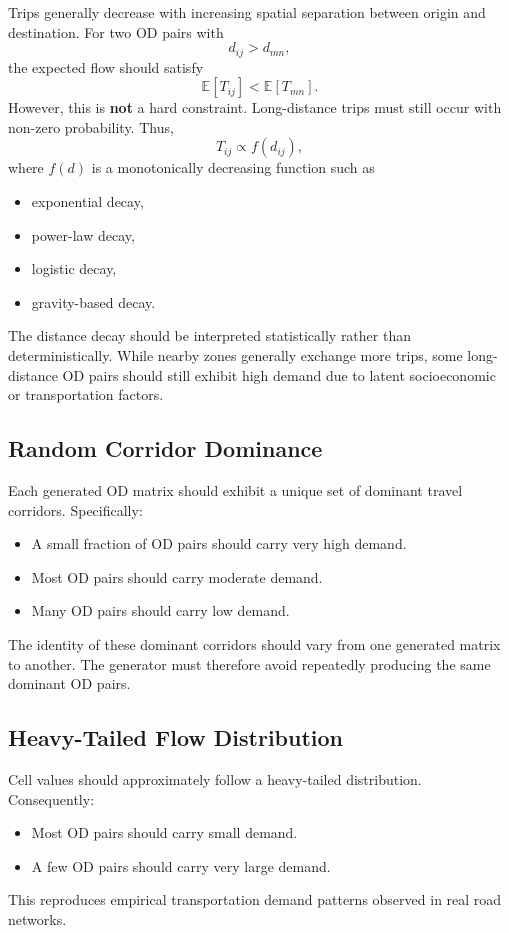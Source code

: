 \documentclass[11pt,a4paper]{article}
\begin{document}
Trips generally decrease with increasing spatial separation between origin and destination. For two OD pairs with
\[
d_{ij}>d_{mn},
\]
the expected flow should satisfy
\[
\mathbb{E}[T_{ij}]<\mathbb{E}[T_{mn}].
\]
However, this is \textbf{not} a hard constraint. Long-distance trips must still occur with non-zero probability. Thus,
\[
T_{ij}\propto f(d_{ij}),
\]
where $f(d)$ is a monotonically decreasing function such as
\begin{itemize}
    \item exponential decay,
    \item power-law decay,
    \item logistic decay,
    \item gravity-based decay.
\end{itemize}
The distance decay should be interpreted statistically rather than deterministically. While nearby zones generally exchange more trips, some long-distance OD pairs should still exhibit high demand due to latent socioeconomic or transportation factors.

\subsection{Random Corridor Dominance}

Each generated OD matrix should exhibit a unique set of dominant travel corridors. Specifically:
\begin{itemize}
    \item A small fraction of OD pairs should carry very high demand.
    \item Most OD pairs should carry moderate demand.
    \item Many OD pairs should carry low demand.
\end{itemize}
The identity of these dominant corridors should vary from one generated matrix to another. The generator must therefore avoid repeatedly producing the same dominant OD pairs.

\subsection{Heavy-Tailed Flow Distribution}

Cell values should approximately follow a heavy-tailed distribution. Consequently:
\begin{itemize}
    \item Most OD pairs should carry small demand.
    \item A few OD pairs should carry very large demand.
\end{itemize}
This reproduces empirical transportation demand patterns observed in real road networks.
\end{document}

